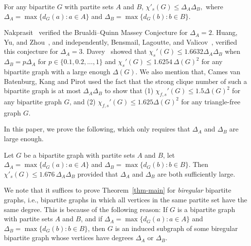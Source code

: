 \documentclass[11pt]{amsart}
\begin{document}
 
\begin{conjecture} \label{conj:BQ}
For any bipartite \( G  \) with partite sets $A$ and $B$, 
\(
\chi'_s(G) \le \Delta_A \Delta_B, 
\)
where $\Delta_A=\max\{d_G(a):a\in A\}$ and $\Delta_B=\max\{d_G(b): b\in B\}$. 
\end{conjecture}

Nakprasit~\cite{Nakprasit2008StrongChromaticIndexBipartite} verified the Brualdi--Quinn Massey Conjecture for \( \Delta_A = 2 \). Huang, Yu, and Zhou~\cite{HuangYuZhou2017StrongChromaticIndex3DeltaBipartite}, and independently, Bensmail, Lagoutte, and Valicov~\cite{BensmailLagoutteValicov2016StrongEdgeColoring3DeltaBipartite}, verified this conjecture for \( \Delta_A = 3 \).  Davey~\cite{davey2024local} showed that \(\chi_s'(G)\le 1.6632\Delta_A\Delta_B\) when $\Delta_B=p\Delta_A$ for $p\in\{0.1,0.2,\ldots,1\}$ and  \(\chi_s'(G)\le 1.6254\,\Delta(G)^2 \) for any bipartite graph with a large enough $\Delta(G)$.  We also mention that, Cames van Batenburg, Kang and Pirot \cite{van2020strong} used the fact that the strong clique number of such a bipartite graph is at most $\Delta_A\Delta_B$ to show that (1) $\chi_{f,s}'(G) \le 1.5\Delta(G)^2$ for any bipartite graph $G$, and (2) $\chi_{f,s}'(G) \le 1.625\Delta(G)^2$ for any triangle-free graph $G$. 



In this paper, we prove the following, which only requires that $\Delta_A$ and $\Delta_B$ are large enough.  

\begin{theorem}\label{thm-main}
Let \( G\) be a bipartite graph with partite sets $A$ and $B$, let $\Delta_A=\max\{d_G(a):a\in A\}$ and $\Delta_B=\max\{d_G(b): b\in B\}$. Then  \(
\chi'_s(G) \le 1.676\,\Delta_A \Delta_B\) provided that  $\Delta_A$ and $\Delta_B$ are both sufficiently large.
\end{theorem}

We note that it suffices to prove Theorem~\ref{thm-main} for {\it biregular} bipartite graphs, i.e., bipartite graphs in which all vertices in the same partite set have the same degree. This is because of the following reason: If $G$ is a bipartite graph with partite sets $A$ and $B$, and if $\Delta_A=\max\{d_G(a):a\in A\}$ and $\Delta_B=\max\{d_G(b): b\in B\}$, then $G$ is an induced subgraph of some biregular bipartite graph whose vertices have degrees $\Delta_A$ or $\Delta_B$.
\end{document}
